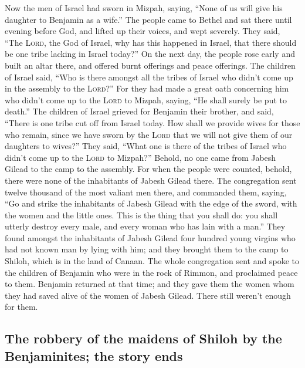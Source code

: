  Now the men of Israel had sworn in Mizpah, saying, ``None
of us will give his daughter to Benjamin as a wife.''  The
people came to Bethel and sat there until evening before God, and lifted
up their voices, and wept severely.  They said, ``The
\textsc{Lord}, the God of Israel, why has this happened in Israel, that
there should be one tribe lacking in Israel today?''  On
the next day, the people rose early and built an altar there, and
offered burnt offerings and peace offerings.  The children
of Israel said, ``Who is there amongst all the tribes of Israel who
didn't come up in the assembly to the \textsc{Lord}?'' For they had made
a great oath concerning him who didn't come up to the \textsc{Lord} to
Mizpah, saying, ``He shall surely be put to death.''  The
children of Israel grieved for Benjamin their brother, and said, ``There
is one tribe cut off from Israel today.  How shall we
provide wives for those who remain, since we have sworn by the
\textsc{Lord} that we will not give them of our daughters to wives?''
 They said, ``What one is there of the tribes of Israel
who didn't come up to the \textsc{Lord} to Mizpah?'' Behold, no one came
from Jabesh Gilead to the camp to the assembly.  For when
the people were counted, behold, there were none of the inhabitants of
Jabesh Gilead there.  The congregation sent twelve
thousand of the most valiant men there, and commanded them, saying, ``Go
and strike the inhabitants of Jabesh Gilead with the edge of the sword,
with the women and the little ones.  This is the thing
that you shall do: you shall utterly destroy every male, and every woman
who has lain with a man.''  They found amongst the
inhabitants of Jabesh Gilead four hundred young virgins who had not
known man by lying with him; and they brought them to the camp to
Shiloh, which is in the land of Canaan.  The whole
congregation sent and spoke to the children of Benjamin who were in the
rock of Rimmon, and proclaimed peace to them.  Benjamin
returned at that time; and they gave them the women whom they had saved
alive of the women of Jabesh Gilead. There still weren't enough for
them.

\hypertarget{the-robbery-of-the-maidens-of-shiloh-by-the-benjaminites-the-story-ends}{%
\subsection{The robbery of the maidens of Shiloh by the Benjaminites;
the story
ends}\label{the-robbery-of-the-maidens-of-shiloh-by-the-benjaminites-the-story-ends}}

